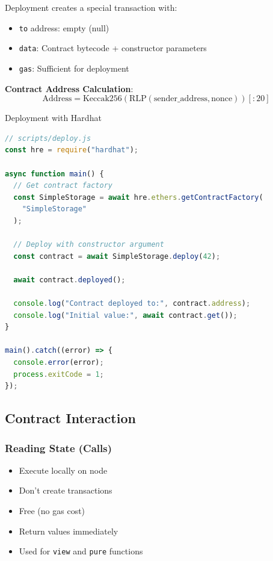 \documentclass[11pt,a4paper]{article}
\begin{document}
Deployment creates a special transaction with:
\begin{itemize}
  \item \texttt{to} address: empty (null)
  \item \texttt{data}: Contract bytecode + constructor parameters
  \item \texttt{gas}: Sufficient for deployment
\end{itemize}

\textbf{Contract Address Calculation}:
\[
\text{Address} = \text{Keccak256}(\text{RLP}(\text{sender\_address}, \text{nonce}))[:20]
\]

\begin{examplebox}{Deployment with Hardhat}
\begin{lstlisting}[language=JavaScript]
// scripts/deploy.js
const hre = require("hardhat");

async function main() {
  // Get contract factory
  const SimpleStorage = await hre.ethers.getContractFactory(
    "SimpleStorage"
  );

  // Deploy with constructor argument
  const contract = await SimpleStorage.deploy(42);

  await contract.deployed();

  console.log("Contract deployed to:", contract.address);
  console.log("Initial value:", await contract.get());
}

main().catch((error) => {
  console.error(error);
  process.exitCode = 1;
});
\end{lstlisting}
\end{examplebox}

\subsection{Contract Interaction}

\subsubsection{Reading State (Calls)}

\begin{itemize}
  \item Execute locally on node
  \item Don't create transactions
  \item Free (no gas cost)
  \item Return values immediately
  \item Used for \texttt{view} and \texttt{pure} functions
\end{itemize}
\end{document}
